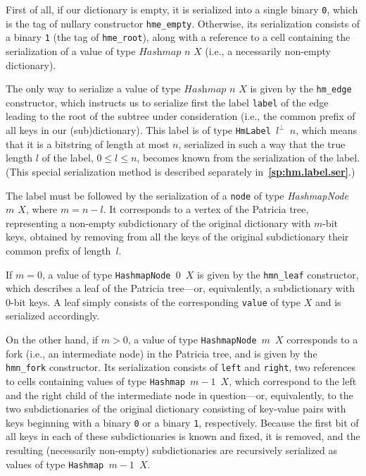 \documentclass[12pt,oneside]{article}
\def\refpoint#1{{\rm\textbf{\ref{#1}}}}
\let\ptref=\refpoint
\let\tp=\textit
\def\Hashmap{\tp{Hashmap}}
\begin{document}
First of all, if our dictionary is empty, it is serialized into a single binary {\tt 0}, which is the tag of nullary constructor {\tt hme\_empty}. Otherwise, its serialization consists of a binary {\tt 1} (the tag of {\tt hme\_root}), along with a reference to a cell containing the serialization of a value of type $\Hashmap$ $n$ $X$ (i.e., a necessarily non-empty dictionary).

The only way to serialize a value of type $\Hashmap$ $n$ $X$ is given by the {\tt hm\_edge} constructor, which instructs us to serialize first the label {\tt label} of the edge leading to the root of the subtree under consideration (i.e., the common prefix of all keys in our (sub)dictionary). This label is of type {\tt HmLabel $l^\perp$ $n$}, which means that it is a bitstring of length at most $n$, serialized in such a way that the true length $l$ of the label, $0\leq l\leq n$, becomes known from the serialization of the label. (This special serialization method is described separately in~\ptref{sp:hm.label.ser}.)

The label must be followed by the serialization of a {\tt node} of type {\em Hashmap\-Node $m$ $X$}, where $m=n-l$. It corresponds to a vertex of the Patricia tree, representing a non-empty subdictionary of the original dictionary with $m$-bit keys, obtained by removing from all the keys of the original subdictionary their common prefix of length~$l$.

If $m=0$, a value of type {\tt HashmapNode $0$ $X$} is given by the {\tt hmn\_leaf} constructor, which describes a leaf of the Patricia tree---or, equivalently, a subdictionary with $0$-bit keys. A leaf simply consists of the corresponding {\tt value} of type $X$ and is serialized accordingly.

On the other hand, if $m>0$, a value of type {\tt HashmapNode $m$ $X$} corresponds to a fork (i.e., an intermediate node) in the Patricia tree, and is given by the {\tt hmn\_fork} constructor. Its serialization consists of {\tt left} and {\tt right}, two references to cells containing values of type {\tt Hashmap $m-1$ $X$}, which correspond to the left and the right child of the intermediate node in question---or, equivalently, to the two subdictionaries of the original dictionary consisting of key-value pairs with keys beginning with a binary {\tt 0} or a binary {\tt 1}, respectively. Because the first bit of all keys in each of these subdictionaries is known and fixed, it is removed, and the resulting (necessarily non-empty) subdictionaries are recursively serialized as values of type {\tt Hashmap $m-1$ $X$}.
\end{document}
